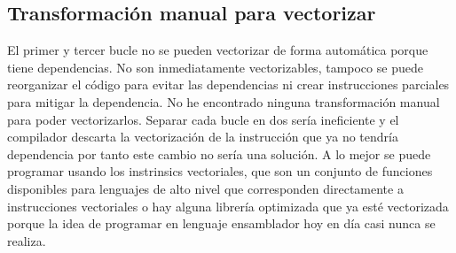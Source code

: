 \subsection{Transformación manual para vectorizar}




\par El primer y tercer bucle no se pueden vectorizar de forma automática porque tiene dependencias. No son inmediatamente
vectorizables, tampoco se puede reorganizar el código para evitar las dependencias ni crear instrucciones parciales para mitigar la
dependencia. No he encontrado ninguna transformación manual para poder vectorizarlos. Separar cada bucle en dos sería
ineficiente y el compilador descarta la vectorización de la instrucción que ya no tendría dependencia por tanto este cambio no
sería una solución. A lo mejor se puede programar usando los instrinsics vectoriales, que son un conjunto de funciones
disponibles para lenguajes de alto nivel que corresponden directamente a instrucciones vectoriales o hay alguna librería
optimizada que ya esté vectorizada porque la idea de programar en lenguaje ensamblador hoy en día casi nunca se realiza.